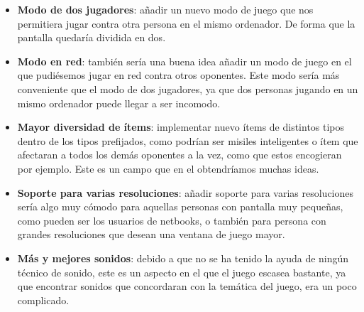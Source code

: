 \documentclass[a4paper,11pt]{article} %
\begin{document}
\begin{itemize}
    \item \textbf{Modo de dos jugadores}: añadir un nuevo modo de juego que nos permitiera jugar contra otra persona en el mismo
    ordenador. De forma que la pantalla quedaría dividida en dos.
    
    \item \textbf{Modo en red}: también sería una buena idea añadir un modo de
    juego en el que pudiésemos jugar en red contra otros
    oponentes. Este modo sería más conveniente que el modo de dos jugadores, ya que dos personas jugando en un mismo ordenador
    puede llegar a ser incomodo.
    
    \item \textbf{Mayor diversidad de ítems}: implementar nuevo ítems de distintos tipos dentro de los tipos prefijados, como 
    podrían ser misiles inteligentes o ítem que afectaran a todos los demás oponentes a la vez, como que estos encogieran por
    ejemplo. Este es un campo que en el obtendríamos muchas ideas.
    
    \item \textbf{Soporte para varias resoluciones}: añadir soporte para varias resoluciones sería algo muy cómodo para aquellas 
    personas con pantalla muy pequeñas, como pueden ser los usuarios de netbooks, o también para persona con grandes resoluciones
    que desean una ventana de juego mayor.
    
    
    \item \textbf{Más y mejores sonidos}: debido a que no se ha tenido la ayuda de ningún técnico de sonido, este es un aspecto en el que el
    juego escasea bastante, ya que encontrar sonidos que concordaran con la temática del juego, era un poco complicado.
\end{itemize}
\end{document}

